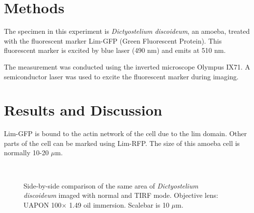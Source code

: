 
\section{Methods}

The specimen in this experiment is \textit{Dictyostelium discoideum}, an amoeba, treated with the fluorescent marker Lim-GFP (Green Fluorescent Protein). 
This fluorescent marker is excited by blue laser (490 nm) and emits at 510 nm. 

The measurement was conducted using the inverted microscope Olympus IX71. 
A semiconductor laser was used to excite the fluorescent marker during imaging.
\section{Results and Discussion}
Lim-GFP is bound to the actin network of the cell due to the lim domain. Other parts of the cell can be marked using Lim-RFP.
The size of this amoeba cell is normally 10-20 $\mu$m.

\begin{figure}[h]
\centering
{} \hspace{0.1mm}
 \\
\caption[a: normal, b: opsec.]{Side-by-side comparison of the same area of \textit{Dictyostelium discoideum} imaged with normal and TIRF mode. 
Objective lens: UAPON 100$\times$ 1.49 oil immersion. 
Scalebar is 10 $\mu$m.} 
\label{fig:amoebatirf}
\end{figure}


